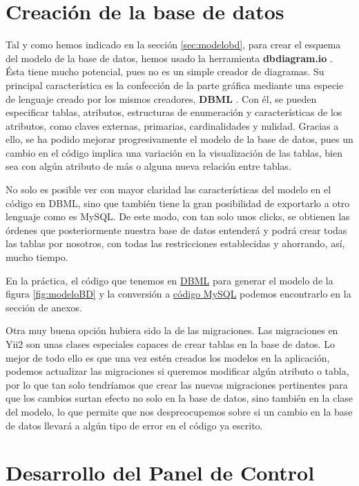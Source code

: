 \section{Creación de la base de datos}

Tal y como hemos indicado en la sección \ref{sec:modelobd}, para crear el esquema del modelo de la base de datos, hemos usado la herramienta \textbf{dbdiagram.io} \cite{dbdiagram}. Ésta tiene mucho potencial, pues no es un simple creador de diagramas. Su principal característica es la confección de la parte gráfica mediante una especie de lenguaje creado por los mismos creadores, \textbf{DBML} \cite{dbml}. Con él, se pueden especificar tablas, atributos, estructuras de enumeración y características de los atributos, como claves externas, primarias, cardinalidades y nulidad. Gracias a ello, se ha podido mejorar progresivamente el modelo de la base de datos, pues un cambio en el código implica una variación en la visualización de las tablas, bien sea con algún atributo de más o alguna nueva relación entre tablas.

No solo es posible ver con mayor claridad las características del modelo en el código en DBML, sino que también tiene la gran posibilidad de exportarlo a otro lenguaje como es MySQL. De este modo, con tan solo unos clicks, se obtienen las órdenes que posteriormente nuestra base de datos entenderá y podrá crear todas las tablas por nosotros, con todas las restricciones establecidas y ahorrando, así, mucho tiempo.

En la práctica, el código que tenemos en \hyperref[anexo:dbml]{DBML} para generar el modelo de la figura \ref{fig:modeloBD} y la conversión a  \hyperref[anexo:mysql]{código MySQL} podemos encontrarlo en la sección de anexos.

Otra muy buena opción hubiera sido la de las migraciones. Las migraciones en Yii2 son unas clases especiales capaces de crear tablas en la base de datos. Lo mejor de todo ello es que una vez estén creados los modelos en la aplicación, podemos actualizar las migraciones si queremos modificar algún atributo o tabla, por lo que tan solo tendríamos que crear las nuevas migraciones pertinentes para que los cambios surtan efecto no solo en la base de datos, sino también en la clase del modelo, lo que permite que nos despreocupemos sobre si un cambio en la base de datos llevará a algún tipo de error en el código ya escrito.

\section{Desarrollo del Panel de Control}

